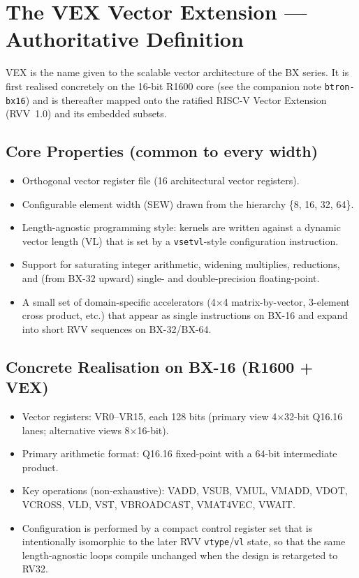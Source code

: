 \documentclass[11pt,a4paper]{article}
\begin{document}
\section{The VEX Vector Extension --- Authoritative Definition}

VEX is the name given to the scalable vector architecture of the BX series. It is first realised concretely on the 16-bit R1600 core (see the companion note \texttt{btron-bx16}) and is thereafter mapped onto the ratified RISC-V Vector Extension (RVV~1.0) and its embedded subsets.

\subsection{Core Properties (common to every width)}

\begin{itemize}[leftmargin=1.5em]
  \item Orthogonal vector register file (16 architectural vector registers).
  \item Configurable element width (SEW) drawn from the hierarchy \{8, 16, 32, 64\}.
  \item Length-agnostic programming style: kernels are written against a dynamic vector length (VL) that is set by a \texttt{vsetvl}-style configuration instruction.
  \item Support for saturating integer arithmetic, widening multiplies, reductions, and (from BX-32 upward) single- and double-precision floating-point.
  \item A small set of domain-specific accelerators (4$\times$4 matrix-by-vector, 3-element cross product, etc.) that appear as single instructions on BX-16 and expand into short RVV sequences on BX-32/BX-64.
\end{itemize}

\subsection{Concrete Realisation on BX-16 (R1600 + VEX)}

\begin{itemize}[leftmargin=1.5em]
  \item Vector registers: VR0--VR15, each 128 bits (primary view 4$\times$32-bit Q16.16 lanes; alternative views 8$\times$16-bit).
  \item Primary arithmetic format: Q16.16 fixed-point with a 64-bit intermediate product.
  \item Key operations (non-exhaustive): VADD, VSUB, VMUL, VMADD, VDOT, VCROSS, VLD, VST, VBROADCAST, VMAT4VEC, VWAIT.
  \item Configuration is performed by a compact control register set that is intentionally isomorphic to the later RVV \texttt{vtype}/\texttt{vl} state, so that the same length-agnostic loops compile unchanged when the design is retargeted to RV32.
\end{itemize}
\end{document}
